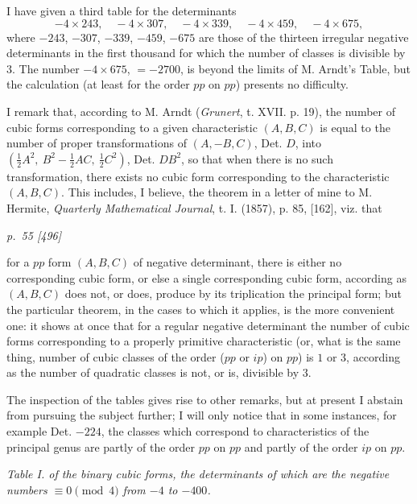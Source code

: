 ﻿\documentclass[11pt,a4paper]{article}
\theoremstyle{plain}
\theoremstyle{definition}
\begin{document}
I have given a third table for the determinants
\[
-4\times243,\quad -4\times307,\quad -4\times339,\quad -4\times459,\quad
-4\times675,
\]
where \(-243\), \(-307\), \(-339\), \(-459\), \(-675\) are those of the
thirteen irregular negative determinants in the first thousand for which
the number of classes is divisible by \(3\). The number \(-4\times675\),
\(=-2700\), is beyond the limits of M. Arndt's Table, but the calculation
(at least for the order \(pp\) on \(pp\)) presents no difficulty.

I remark that, according to M. Arndt (\textit{Grunert}, t. XVII. p. 19),
the number of cubic forms corresponding to a given characteristic
\((A,B,C)\) is equal to the number of proper transformations of
\((A,-B,C)\), Det. \(D\), into
\((\tfrac12A^2,\ B^2-\tfrac12AC,\ \tfrac12C^2)\), Det. \(DB^2\), so that
when there is no such transformation, there exists no cubic form
corresponding to the characteristic \((A,B,C)\). This includes, I believe,
the theorem in a letter of mine to M. Hermite, \textit{Quarterly
Mathematical Journal}, t. I. (1857), p. 85, [162], viz. that

\clearpage
\textit{p.~55 [496]}

for a \(pp\) form \((A,B,C)\) of negative determinant, there is either no
corresponding cubic form, or else a single corresponding cubic form,
according as \((A,B,C)\) does not, or does, produce by its triplication the
principal form; but the particular theorem, in the cases to which it
applies, is the more convenient one: it shows at once that for a regular
negative determinant the number of cubic forms corresponding to a properly
primitive characteristic (or, what is the same thing, number of cubic
classes of the order (\(pp\) or \(ip\)) on \(pp\)) is \(1\) or \(3\),
according as the number of quadratic classes is not, or is, divisible by
\(3\).

The inspection of the tables gives rise to other remarks, but at present I
abstain from pursuing the subject further; I will only notice that in some
instances, for example Det. \(-224\), the classes which correspond to
characteristics of the principal genus are partly of the order \(pp\) on
\(pp\) and partly of the order \(ip\) on \(pp\).

\textit{Table I. of the binary cubic forms, the determinants of which are
the negative numbers \(\equiv0\pmod 4\) from \(-4\) to \(-400\).}
\end{document}
